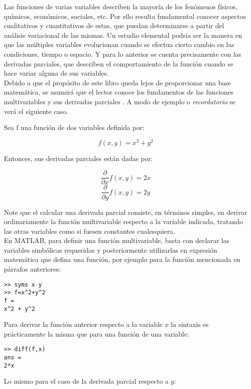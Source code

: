 Las funciones de varias variables describen la mayoría de los fenómenos físicos, químicos, económicos, sociales, etc.
Por ello resulta fundamental conocer aspectos cualitativos y cuantitativos de estas, que puedan determinarse a partir
del análisis variacional de las mismas. Un estudio elemental podría ser la manera en que las múltiples variables 
evolucionan cuando se efectua cierto cambio en las condiciones, tiempo o espacio. Y para lo anterior se cuenta 
precisamente con las derivadas parciales, que describen el comportamiento de la función cuando se hace variar alguna
de sus variables.\\

Debido a que el propósito de este libro queda lejos de proporcionar una base matemática, se asumirá que el
lector conoce los fundamentos de las funciones multivariables y sus derivadas parciales . 
A modo de ejemplo o \textit{recordatorio} se verá el siguiente caso.

Sea f una función de dos variables definida por:

$$ f(x,y) = x^2 + y^2 $$

Entonces, sus derivadas parciales están dadas por:

$$ \frac{\partial}{\partial x} f(x,y) = 2x $$
$$ \frac{\partial}{\partial y} f(x,y) = 2y $$

Note que el calcular una derivada parcial consiste, en términos simples, en derivar ordinariamente la función 
multivariable respecto a la variable indicada, tratando las otras variables como si fuesen constantes cualesquiera.\\

En MATLAB, para definir una función multivariable, basta con declarar las variables simbólicas requeridas 
y posteriormente utilizarlas en expresión matemática que defina una función, por ejemplo para la función 
mencionada en párrafos anteriores:

\begin{verbatim}
>> syms x y
>> f=x^2+y^2
f =
x^2 + y^2
\end{verbatim}

Para derivar la función anterior respecto a la variable $x$ la sintaxis es prácticamente la misma que para 
una función de una variable:

\begin{verbatim}
>> diff(f,x)
ans =
2*x
\end{verbatim}

Lo mismo para el caso de la derivada parcial respecto a $y$:


